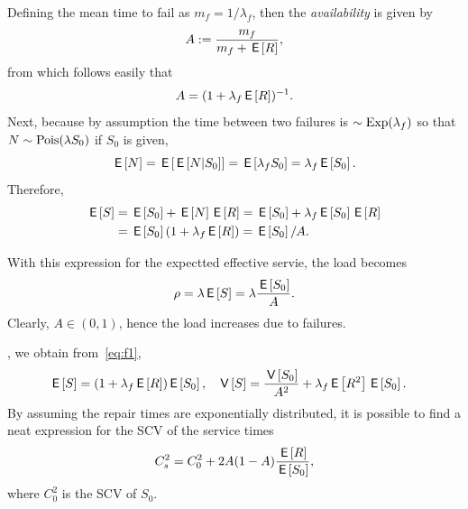 \documentclass[queueing-book.tex]{subfiles}
\begin{document}
Defining the mean time to fail as $m_{f} = 1/\lambda_f$, then the  \emph{availability} is given by
\begin{equation*}
 A:=\frac{m_f}{m_f + \,\mathsf{E}\left[R\right]},
\end{equation*}
from which follows  easily that
\begin{equation}\label{eq:91}
A=(1+\lambda_f \,\mathsf{E}\left[R\right])^{-1}.
\end{equation}
Next, because by assumption the time between two failures is $\sim \mathrm{Exp}(\lambda_{f})$ so that $N\sim \mathrm{Pois}(\lambda S_{0})$ if $S_{0}$ is given,
\begin{equation}
\label{eq:38}
\,\mathsf{E}\left[N\right] = \,\mathsf{E}\left[\,\mathsf{E}\left[N|S_{0}\right]\right] = \,\mathsf{E}\left[\lambda_{f}S_{0}\right] = \lambda_{f} \,\mathsf{E}\left[S_{0}\right].
\end{equation}
Therefore,
 \begin{align*}
   \,\mathsf{E}\left[S\right] &= \,\mathsf{E}\left[S_0\right] + \,\mathsf{E}\left[N\right] \,\mathsf{E}\left[R\right] = \,\mathsf{E}\left[S_0\right] + \lambda_f \,\mathsf{E}\left[S_0\right] \,\mathsf{E}\left[R\right] \\\
   &= \,\mathsf{E}\left[S_0\right](1+\lambda_f \,\mathsf{E}\left[R\right]) = \,\mathsf{E}\left[S_{0}\right]/A.
 \end{align*}

With this expression for the expectted effective servie, the load becomes
\begin{equation*}
\rho = \lambda \,\mathsf{E}\left[S\right] = \lambda \frac{\,\mathsf{E}\left[S_0\right]}A.
\end{equation*}
Clearly, $A\in (0,1)$, hence the load increases due to failures.

, we obtain from~\cref{eq:f1},
 \begin{align}\label{eq:f2}
\,\mathsf{E}\left[S\right] &= (1+\lambda_f \,\mathsf{E}\left[R\right]) \,\mathsf{E}\left[S_0\right], & \,\mathsf{V}\left[S\right] &= \frac{\,\mathsf{V}\left[S_0\right]}{A^2} + \lambda_f \,\mathsf{E}\left[R^2\right] \,\mathsf{E}\left[S_0\right].
 \end{align}
By assuming the repair times are exponentially distributed, it is possible to find a neat expression for the SCV of the service times
\begin{equation}\label{eq:f3}
 C_s^2 = C_0^2 + 2 A(1-A) \frac{\,\mathsf{E}\left[R\right]}{\,\mathsf{E}\left[S_0\right]},
\end{equation}
where $C_0^2$ is the SCV of $S_0$.
\end{document}
